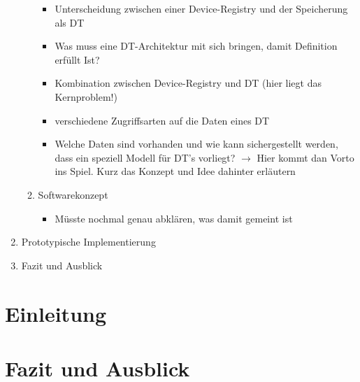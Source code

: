 \documentclass[
	12pt,
	BCOR=5mm,
	DIV=12,
	headinclude=on,
	footinclude=off,
	parskip=half,
	bibliography=totoc,
	listof=entryprefix,
	toc=listof,
	numbers=noenddot,
	plainfootsepline
]{scrreprt}
\begin{document}
\begin{enumerate}
\begin{enumerate}
\begin{itemize}
			\item Unterscheidung zwischen einer Device-Registry und der Speicherung als DT
			\item Was muss eine DT-Architektur mit sich bringen, damit Definition erfüllt Ist?
			\item Kombination zwischen Device-Registry und DT (hier liegt das Kernproblem!)
			\item verschiedene Zugriffsarten auf die Daten eines DT
			\item Welche Daten sind vorhanden und wie kann sichergestellt werden, dass ein speziell Modell für DT's vorliegt? $\rightarrow$ Hier kommt dan Vorto ins Spiel. Kurz das Konzept und Idee dahinter erläutern
		\end{itemize}
		\item Softwarekonzept
		\begin{itemize}
			\item Müsste nochmal genau abklären, was damit gemeint ist
		\end{itemize}
	\end{enumerate}
	\item Prototypische Implementierung 
	\item Fazit und Ausblick
\end{enumerate}

\chapter{Einleitung}

% 

% 

\chapter{Fazit und Ausblick}

\clearpage
\ihead{}
\printbibliography[title=Literaturverzeichnis]
\cleardoublepage

\end{document}
